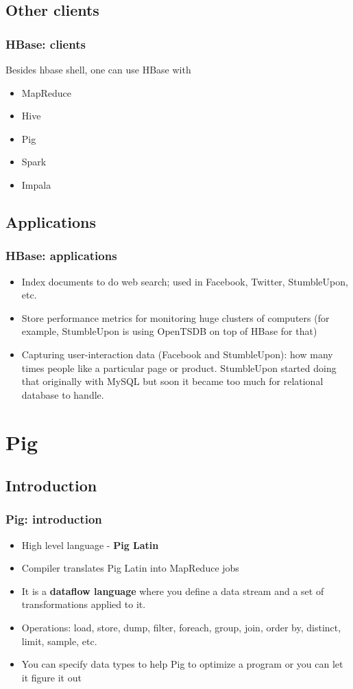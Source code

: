 \documentclass{beamer}
\begin{document}
\subsection{Other clients}
\begin{frame}
 \frametitle{HBase: clients}
 Besides hbase shell, one can use HBase with
 \begin{itemize}
  \item MapReduce
  \item Hive
  \item Pig
  \item Spark
  \item Impala
 \end{itemize}
\end{frame}

\subsection{Applications}
\begin{frame}
 \frametitle{HBase: applications}
 \begin{itemize}
   \item Index documents to do web search; used in Facebook, Twitter, StumbleUpon, etc.
   \item Store performance metrics for monitoring huge clusters of computers (for example, StumbleUpon is using OpenTSDB on top of HBase for that)
   \item Capturing user-interaction data (Facebook and StumbleUpon): how many times people like a particular page or product. StumbleUpon started doing that originally with MySQL 
     but soon it became too much for relational database to handle.
 \end{itemize}
\end{frame}



\section{Pig}
\subsection{Introduction}
\begin{frame}[fragile]
 \frametitle{Pig: introduction}
 \begin{itemize}
  \item High level language - {\color{mycolordef}\textbf{Pig Latin}}
  \item Compiler translates Pig Latin into MapReduce jobs
  \item It is a {\color{mycolordef}\textbf{dataflow language}} where you define a data stream and a set of transformations applied to it.
  \item Operations: load, store, dump, filter, foreach, group, join, order by, distinct, limit, sample, etc.
  \item You can specify data types to help Pig to optimize a program or you can let it figure it out
 \end{itemize}
\end{frame}
\end{document}

